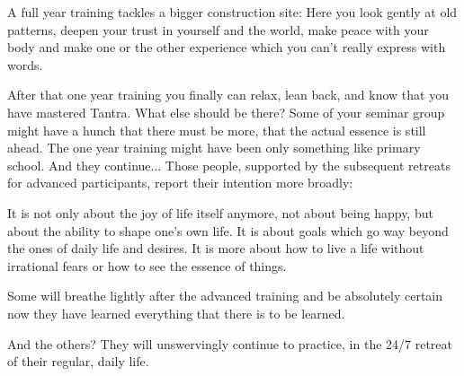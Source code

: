 A full year training tackles a bigger construction site: Here you look gently at old patterns, deepen your trust in yourself and the world, make peace with your body and make one or the other experience which you can't really express with words.

After that one year training you finally can relax, lean back, and know that you have mastered Tantra. What else should be there? Some of your seminar group might have a hunch that there must be more, that the actual essence is still ahead. The one year training might have been only something like primary school. And they continue... Those people, supported by the subsequent retreats for advanced participants, report their intention more broadly:

It is not only about the joy of life itself anymore, not about being happy, but about the ability to shape one's own life. It is about goals which go way beyond the ones of daily life and desires. It is more about how to live a life without irrational fears or how to see the essence of things.

Some will breathe lightly after the advanced training and be absolutely certain now they have learned everything that there is to be learned.

And the others? They will unswervingly continue to practice, in the 24/7 retreat of their regular, daily life.